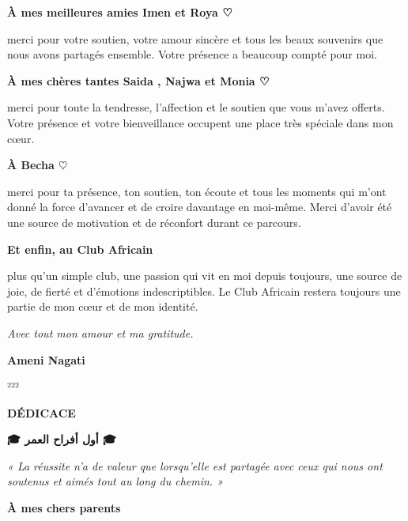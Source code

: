 \begin{center}
	\textbf{\large À mes meilleures amies Imen et Roya ♡}
\end{center}

merci pour votre soutien, votre amour sincère et tous les beaux souvenirs que nous avons partagés ensemble. Votre présence a beaucoup compté pour moi.

\vspace{0.7cm}

\begin{center}
	\textbf{\large À mes chères tantes Saida , Najwa et Monia ♡}
\end{center}

merci pour toute la tendresse, l’affection et le soutien que vous m’avez offerts. Votre présence et votre bienveillance occupent une place très spéciale dans mon cœur.

\vspace{0.7cm}

\begin{center}
	\textbf{\large À Becha $\heartsuit$}
\end{center}

merci pour ta présence, ton soutien, ton écoute et tous les moments qui m’ont donné la force d’avancer et de croire davantage en moi-même. Merci d’avoir été une source de motivation et de réconfort durant ce parcours.

\vspace{0.7cm}

\begin{center}
	\textbf{\large Et enfin, au Club Africain}
\end{center}

plus qu’un simple club, une passion qui vit en moi depuis toujours, une source de joie, de fierté et d’émotions indescriptibles. Le Club Africain restera toujours une partie de mon cœur et de mon identité.

\vfill

\begin{flushright}
	\textit{\large Avec tout mon amour et ma gratitude.}
	
	\vspace{0.4cm}
	
	\textbf{Ameni Nagati}
\end{flushright}²²²
\newpage
\thispagestyle{empty}

\begin{center}
	
	{\Huge \textbf{DÉDICACE}}
	
	\vspace{1cm}
	
	{\large\bfseries 🎓 \textarabic{أول أفراح العمر} 🎓}
	
	\vspace{0.8cm}
	
	\textit{« La réussite n’a de valeur que lorsqu’elle est partagée avec ceux qui nous ont soutenus et aimés tout au long du chemin. »}
	
\end{center}
\begin{center}
	\textbf{\Large À mes chers parents}
\end{center}

